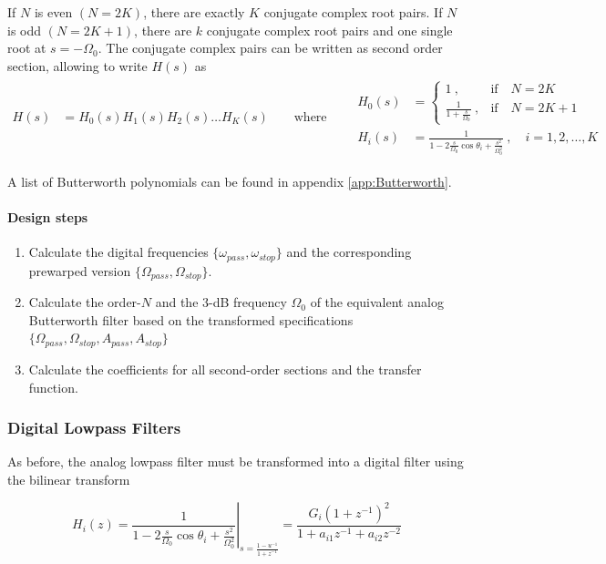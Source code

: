 If $N$ is even $(N = 2K)$, there are exactly $K$ conjugate complex root pairs.
If $N$ is odd $(N = 2K+1)$, there are $k$ conjugate complex root pairs and one
single root at $s = -\Omega_0$. The conjugate complex pairs can be written as
second order section, allowing to write $H(s)$ as \\

\begin{align*}
	H(s) &= H_0(s) H_1(s) H_2(s) \ldots H_K(s) \qquad \text{where} \qquad
	\begin{array}{ll}
		H_0(s) & = \begin{cases}
			1\:, & \text{if} \quad N = 2K \\
			\frac{1}{1 + \frac{s}{\Omega_0}} \:, & \text{if} \quad N = 2K+1
			\end{cases} \\
		H_i(s) &= \frac{1}{1 - 2 \frac{s}{\Omega_0} \cos\theta_i + \frac{s^2}{\Omega_0^2}} \:,\quad i=1,2,\ldots,K
	\end{array}
\end{align*}

A list of Butterworth polynomials can be found in appendix \ref{app:Butterworth}.

\paragraph{Design steps}
\begin{enumerate}
	\item Calculate the digital frequencies $\{\omega_{pass}, \omega_{stop}\}$ 
	and the corresponding prewarped version $\{\Omega_{pass}, \Omega_{stop}\}$.
	\item Calculate the order-$N$ and the 3-dB frequency $\Omega_0$ of the
	 equivalent analog Butterworth filter based on the transformed specifications
	 $\{\Omega_{pass}, \Omega_{stop}, A_{pass}, A_{stop} \}$
	\item Calculate the coefficients for all second-order sections and the transfer function.
\end{enumerate}

\subsubsection{Digital Lowpass Filters}
As before, the analog lowpass filter must be transformed into a digital
filter using the bilinear transform

\begin{equation*}
	H_i(z) = \left.\frac{1}{1 - 2 \frac{s}{\Omega_0}\cos\theta_i + \frac{s^2}{\Omega_0^2}}\right|_{s = \frac{1-u^{-1}}{1+z^{-1}}} = 
	\frac{G_i (1+z^{-1})^2}{1 + a_{i1}z^{-1} + a_{i2}z^{-2}}
\end{equation*}

